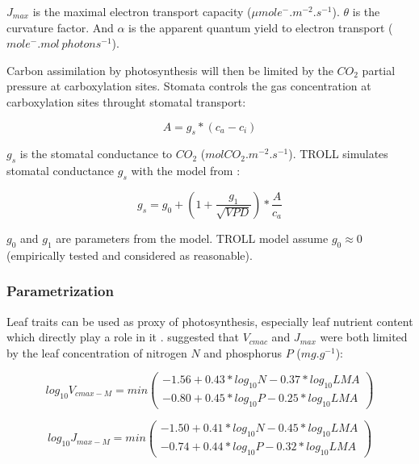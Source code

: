 \documentclass[12pt,]{article}
\theoremstyle{definition}
\theoremstyle{definition}
\theoremstyle{remark}
\begin{document}
\(J_{max}\) is the maximal electron transport capacity
(\(\mu mol e^-.m^{-2}.s^{-1}\)). \(\theta\) is the curvature factor. And
\(\alpha\) is the apparent quantum yield to electron transport
(\(mole^-.mol~photons^{-1}\)).

Carbon assimilation by photosynthesis will then be limited by the
\(CO_2\) partial pressure at carboxylation sites. Stomata controls the
gas concentration at carboxylation sites throught stomatal transport:

\begin{equation}
  A = g_s*(c_a-c_i)
  \label{eq:Ag}
\end{equation}

\(g_s\) is the stomatal conductance to \(CO_2\)
(\(molCO_2.m^{-2}.s^{-1}\)). TROLL simulates stomatal conductance
\(g_s\) with the model from \citep{Medlyn2011}:

\begin{equation}
  g_s = g_0 + (1 + \frac{g_1}{\sqrt{VPD}})*\frac{A}{c_a}
  \label{eq:gs}
\end{equation}

\(g_0\) and \(g_1\) are parameters from the model. TROLL model assume
\(g_0 \approx 0\) (empirically tested and considered as reasonable).

\subsubsection{Parametrization}\label{parametrization}

Leaf traits can be used as proxy of photosynthesis, especially leaf
nutrient content which directly play a role in it
\citep{wright_worldwide_2004}. \citet{Domingues2010} suggested that
\(V_{cmac}\) and \(J_{max}\) were both limited by the leaf concentration
of nitrogen \(N\) and phosphorus \(P\) (\(mg.g^{-1}\)):

\begin{equation}
  log_{10} V_{cmax-M} = min( 
  \begin{array}{c} 
    -1.56+0.43*log_{10} N-0.37*log_{10} LMA \\
    -0.80+0.45*log_{10} P-0.25*log_{10} LMA 
  \end{array} 
  )
  \label{eq:VcmaxM}
\end{equation}

\begin{equation}
  log_{10} J_{max-M} = min(
  \begin{array}{c} 
    -1.50+0.41*log_{10} N-0.45*log_{10} LMA \\
    -0.74+0.44*log_{10} P-0.32*log_{10} LMA 
  \end{array}
  )
  \label{eq:JmaxM}
\end{equation}
\end{document}
